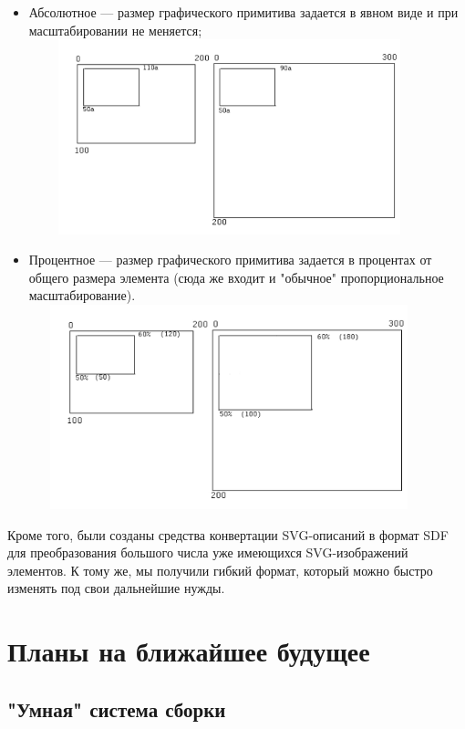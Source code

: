\documentclass[a5paper]{article}
\begin{document}
\begin{itemize}
  \item Абсолютное --- размер графического примитива задается в явном виде и при
        масштабировании не меняется;\newline
    \includegraphics[width=11.622cm,height=5.646cm]{draft04-img4.jpg}
  \item Процентное --- размер графического примитива задается в процентах от
        общего размера элемента (сюда же входит и "обычное" пропорциональное
        масштабирование).\newline
    \includegraphics[width=11.582cm,height=5.927cm]{draft04-img5.jpg}
\end{itemize}

Кроме того, были созданы средства конвертации SVG-описаний в формат SDF
для преобразования большого числа уже имеющихся SVG-изображений
элементов. К тому же, мы получили гибкий формат, который можно быстро
изменять под свои дальнейшие нужды.

\section{Планы на ближайшее будущее}
\subsection{"Умная" система сборки}
\end{document}
